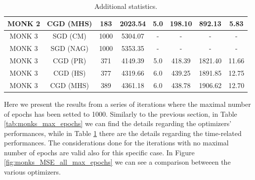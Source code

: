 \begin{table}[H]
\begin{subtable}{\textwidth}
{\begin{tabular}{| c | c | c | c | c | c | c | c |}
                            \hline
                            MONK 2 &  CGD (MHS) &               183 &       2023.54 &            5.0 &   198.10 &   892.13 &      5.83 \\
                            \hline
                            \hline
                            MONK 3 &   SGD (CM) &              1000 &       5304.07 &              - &        - &        - &         - \\
                            \hline
                            MONK 3 &  SGD (NAG) &              1000 &       5353.35 &              - &        - &        - &         - \\
                            \hline
                            \rowcolor[gray]{.9}
                            MONK 3 &   CGD (PR) &               371 &       4149.39 &            5.0 &   418.39 &  1821.40 &     11.66 \\
                            \hline
                            MONK 3 &   CGD (HS) &               377 &       4319.66 &            6.0 &   439.25 &  1891.85 &     12.75 \\
                            \hline
                            MONK 3 &  CGD (MHS) &               389 &       4361.18 &            6.0 &   438.78 &  1906.62 &     12.70 \\
                            \hline
                        \end{tabular}
                    }
                \end{subtable}
                \caption{Additional statistics.}
                \label{tab:monks_additional_max_epochs}
            \end{table}

            Here we present the results from a series of iterations where the maximal number of epochs has
            been setted to 1000. Similarly to the previous section, in Table \ref{tab:monks_max_epochs} we
            can find the details regarding the optimizers' performances, while in Table
            \ref{tab:monks_additional_max_epochs} there are the details regarding the time-related
            performances. The considerations done for the iterations with no maximal number of epochs are
            valid also for this specific case. In Figure \ref{fig:monks_MSE_all_max_epochs} we can see a
            comparison betweeen the various optimizers.

